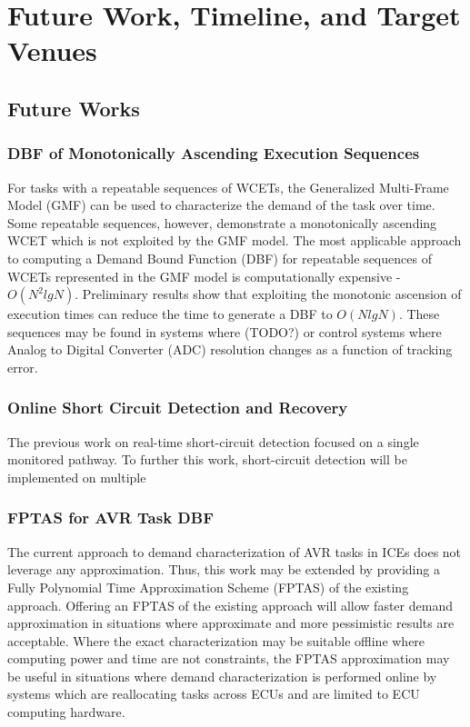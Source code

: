 \section{Future Work, Timeline, and Target Venues} \label{chap:futureWork}

\subsection{Future Works}

\subsubsection{DBF of Monotonically Ascending Execution Sequences}

For tasks with a repeatable sequences of WCETs, the Generalized Multi-Frame Model (GMF) can be used to characterize the demand of the task over time.
Some repeatable sequences, however, demonstrate a monotonically ascending WCET which is not exploited by the GMF model.
The most applicable approach to computing a Demand Bound Function (DBF) for repeatable sequences of WCETs represented in the GMF model is computationally expensive - $O(N^2 lg N)$.
Preliminary results show that exploiting the monotonic ascension of execution times can reduce the time to generate a DBF to $O(N lg N)$.
These sequences may be found in systems where (TODO?) or control systems where Analog to Digital Converter (ADC) resolution changes as a function of tracking error.

\subsubsection{Online Short Circuit Detection and Recovery}

The previous work on real-time short-circuit detection focused on a single monitored pathway.
To further this work, short-circuit detection will be implemented on multiple 

\subsubsection{FPTAS for AVR Task DBF}

The current approach to demand characterization of AVR tasks in ICEs does not leverage any approximation.
Thus, this work may be extended by providing a Fully Polynomial Time Approximation Scheme (FPTAS) of the existing approach.
Offering an FPTAS of the existing approach will allow faster demand approximation in situations where approximate and more pessimistic results are acceptable.
Where the exact characterization may be suitable offline where computing power and time are not constraints, the FPTAS approximation may be useful in situations where demand characterization is performed online by systems which are reallocating tasks across ECUs and are limited to ECU computing hardware.

